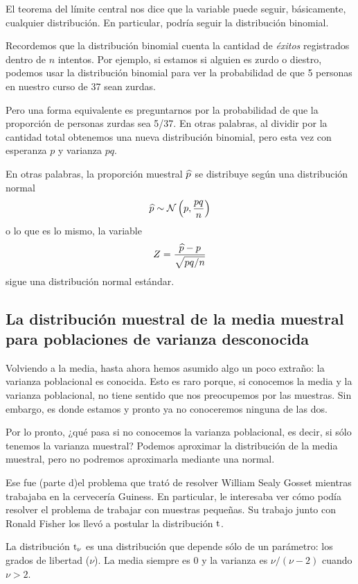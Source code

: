 El teorema del límite central nos dice que la variable puede seguir, básicamente, cualquier distribución. En particular, podría seguir la distribución binomial.

Recordemos que la distribución binomial cuenta la cantidad de \emph{éxitos} registrados dentro de \(n\) intentos. Por ejemplo, si estamos si alguien es zurdo o diestro, podemos usar la distribución binomial para ver la probabilidad de que 5 personas en nuestro curso de 37 sean zurdas. 

Pero una forma equivalente es preguntarnos por la probabilidad de que la proporción de personas zurdas sea 5/37. En otras palabras, al dividir por la cantidad total obtenemos una nueva distribución binomial, pero esta vez con esperanza \(p\) y varianza \(pq\).

En otras palabras, la proporción muestral \(\widehat{p}\) se distribuye según una distribución normal \[\widehat{p}\sim \operatorname{\mathcal{N}}\left( p, \frac{pq}{n} \right)\] o lo que es lo mismo, la variable \[Z = \frac{\widehat{p} - p}{\sqrt{pq/n}}\] sigue una distribución normal estándar.

\subsection{La distribución muestral de la media muestral para poblaciones de varianza desconocida}

Volviendo a la media, hasta ahora hemos asumido algo un poco extraño: la varianza poblacional es conocida. Esto es raro porque, si conocemos la media y la varianza poblacional, no tiene sentido que nos preocupemos por las muestras. Sin embargo, es donde estamos y pronto ya no conoceremos ninguna de las dos.

Por lo pronto, ¿qué pasa si no conocemos la varianza poblacional, es decir, si sólo tenemos la varianza muestral? Podemos aproximar la distribución de la media muestral, pero no podremos aproximarla mediante una normal. 

Ese fue (parte d)el problema que trató de resolver William Sealy Gosset mientras trabajaba en la cervecería Guiness. En particular, le interesaba ver cómo podía resolver el problema de trabajar con muestras pequeñas. Su trabajo junto con Ronald Fisher los llevó a postular la distribución \(\operatorname{t}\).

La distribución \(\operatorname{t}_{\nu}\) es una distribución que depende sólo de un parámetro: los grados de libertad (\(\nu\)). La media siempre es \(0\) y la varianza es \(\nu/(\nu-2)\) cuando \(\nu >2\).

